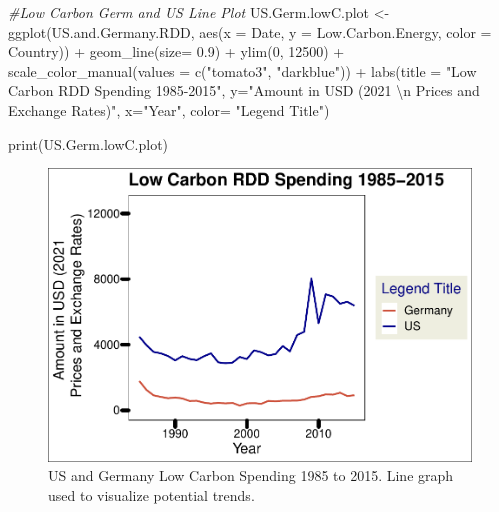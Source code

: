 \documentclass[
  12pt,
]{article}
\newenvironment{Shaded}{\begin{snugshade}}{\end{snugshade}}
\newcommand{\AttributeTok}[1]{\textcolor[rgb]{0.77,0.63,0.00}{#1}}
\newcommand{\CommentTok}[1]{\textcolor[rgb]{0.56,0.35,0.01}{\textit{#1}}}
\newcommand{\DecValTok}[1]{\textcolor[rgb]{0.00,0.00,0.81}{#1}}
\newcommand{\FloatTok}[1]{\textcolor[rgb]{0.00,0.00,0.81}{#1}}
\newcommand{\FunctionTok}[1]{\textcolor[rgb]{0.00,0.00,0.00}{#1}}
\newcommand{\NormalTok}[1]{#1}
\newcommand{\OtherTok}[1]{\textcolor[rgb]{0.56,0.35,0.01}{#1}}
\newcommand{\SpecialCharTok}[1]{\textcolor[rgb]{0.00,0.00,0.00}{#1}}
\newcommand{\StringTok}[1]{\textcolor[rgb]{0.31,0.60,0.02}{#1}}
\begin{document}
\begin{Shaded}
\begin{Highlighting}[]
\CommentTok{\#Low Carbon Germ and US Line Plot}
\NormalTok{US.Germ.lowC.plot }\OtherTok{\textless{}{-}} \FunctionTok{ggplot}\NormalTok{(US.and.Germany.RDD,}
                              \FunctionTok{aes}\NormalTok{(}\AttributeTok{x =}\NormalTok{ Date,}
                                  \AttributeTok{y =}\NormalTok{ Low.Carbon.Energy, }
                                  \AttributeTok{color =}\NormalTok{ Country)) }\SpecialCharTok{+} 
  \FunctionTok{geom\_line}\NormalTok{(}\AttributeTok{size=} \FloatTok{0.9}\NormalTok{) }\SpecialCharTok{+}
  \FunctionTok{ylim}\NormalTok{(}\DecValTok{0}\NormalTok{, }\DecValTok{12500}\NormalTok{) }\SpecialCharTok{+}
  \FunctionTok{scale\_color\_manual}\NormalTok{(}\AttributeTok{values =} \FunctionTok{c}\NormalTok{(}\StringTok{"tomato3"}\NormalTok{, }\StringTok{"darkblue"}\NormalTok{)) }\SpecialCharTok{+}
  \FunctionTok{labs}\NormalTok{(}\AttributeTok{title =} \StringTok{"Low Carbon RDD Spending 1985{-}2015"}\NormalTok{,}
       \AttributeTok{y=}\StringTok{"Amount in USD (2021 }\SpecialCharTok{\textbackslash{}n}\StringTok{ Prices and Exchange Rates)"}\NormalTok{,}
       \AttributeTok{x=}\StringTok{"Year"}\NormalTok{,}
       \AttributeTok{color=} \StringTok{"Legend Title"}\NormalTok{)}

\FunctionTok{print}\NormalTok{(US.Germ.lowC.plot)}
\end{Highlighting}
\end{Shaded}

\begin{figure}
\centering
\includegraphics{Chang_Jenkins_Mullens_ENV872_Final_files/figure-latex/Low Carbon Germ and US Line Plot-1.pdf}
\caption{US and Germany Low Carbon Spending 1985 to 2015. Line graph
used to visualize potential trends.}
\end{figure}
\end{document}
